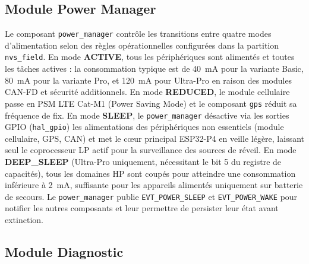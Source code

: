 \subsection{Module Power Manager}
\label{subsec:mod_power}

Le composant \texttt{power\_manager} contrôle les transitions entre
quatre modes d'alimentation selon des règles opérationnelles
configurées dans la partition \texttt{nvs\_field}. En mode
\textbf{ACTIVE}, tous les périphériques sont alimentés et toutes
les tâches actives : la consommation typique est de 40~mA pour la
variante Basic, 80~mA pour la variante Pro, et 120~mA pour
Ultra-Pro en raison des modules CAN-FD et sécurité additionnels.
En mode \textbf{REDUCED}, le module cellulaire passe en PSM LTE
Cat-M1 (Power Saving Mode) et le composant \texttt{gps} réduit
sa fréquence de fix. En mode \textbf{SLEEP}, le \texttt{power\_manager}
désactive via les sorties GPIO (\texttt{hal\_gpio}) les alimentations
des périphériques non essentiels (module cellulaire, GPS, CAN) et
met le cœur principal ESP32-P4 en veille légère, laissant seul le
coprocesseur LP actif pour la surveillance des sources de réveil.
En mode \textbf{DEEP\_SLEEP} (Ultra-Pro uniquement, nécessitant le
bit 5 du registre de capacités), tous les domaines HP sont coupés
pour atteindre une consommation inférieure à 2~mA, suffisante pour
les appareils alimentés uniquement sur batterie de secours.
Le \texttt{power\_manager} publie \texttt{EVT\_POWER\_SLEEP} et
\texttt{EVT\_POWER\_WAKE} pour notifier les autres composants et
leur permettre de persister leur état avant extinction.

\subsection{Module Diagnostic}
\label{subsec:mod_diag}

